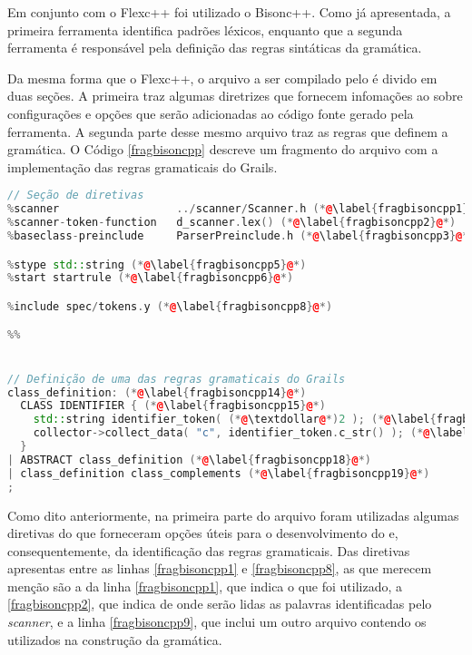 Em conjunto com o \textsf{Flexc++} foi utilizado o \textsf{Bisonc++}. Como já
apresentada, a primeira ferramenta identifica padrões léxicos, enquanto que a
segunda ferramenta é responsável pela definição das regras sintáticas da
gramática.

Da mesma forma que o \textsf{Flexc++}, o arquivo a ser compilado pelo \bisoncpp é divido
em duas seções. A primeira traz algumas diretrizes que fornecem infomações ao
\bisoncpp sobre configurações e opções que serão adicionadas ao código fonte
gerado pela ferramenta. A segunda parte desse mesmo arquivo traz as regras
que definem a gramática. O Código \ref{fragbisoncpp} descreve um fragmento
do arquivo com a implementação das regras gramaticais do \textsf{Grails}.

\begin{lstlisting}[language=C++, label=fragbisoncpp, caption=Fragmento do código fonte para o \bisoncpp]
// Seção de diretivas
%scanner                  ../scanner/Scanner.h (*@\label{fragbisoncpp1}@*)
%scanner-token-function   d_scanner.lex() (*@\label{fragbisoncpp2}@*)
%baseclass-preinclude     ParserPreinclude.h (*@\label{fragbisoncpp3}@*)

%stype std::string (*@\label{fragbisoncpp5}@*)
%start startrule (*@\label{fragbisoncpp6}@*)

%include spec/tokens.y (*@\label{fragbisoncpp8}@*)

%%


// Definição de uma das regras gramaticais do Grails
class_definition: (*@\label{fragbisoncpp14}@*)
  CLASS IDENTIFIER { (*@\label{fragbisoncpp15}@*)
    std::string identifier_token( (*@\textdollar@*)2 ); (*@\label{fragbisoncpp16}@*)
    collector->collect_data( "c", identifier_token.c_str() ); (*@\label{fragbisoncpp17}@*)
  }
| ABSTRACT class_definition (*@\label{fragbisoncpp18}@*)
| class_definition class_complements (*@\label{fragbisoncpp19}@*)
;
\end{lstlisting}

Como dito anteriormente, na primeira parte do arquivo foram utilizadas algumas
diretivas do \bisoncpp que forneceram opções úteis para o desenvolvimento do
\parser e, consequentemente, da identificação das regras gramaticais. Das
diretivas apresentas entre as linhas \ref{fragbisoncpp1} e
\ref{fragbisoncpp8}, as que merecem menção são a da linha
\ref{fragbisoncpp1}, que indica o \scanner que foi utilizado,
a \ref{fragbisoncpp2}, que indica de onde serão lidas as palavras identificadas
pelo \textit{scanner}, e a linha \ref{fragbisoncpp9}, que inclui um outro
arquivo contendo os \tokens utilizados na construção da gramática.

